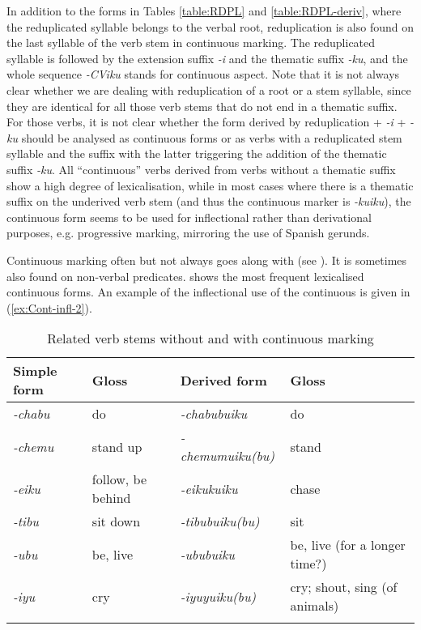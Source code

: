 In addition to the forms in Tables \ref{table:RDPL} and \ref{table:RDPL-deriv}, where the reduplicated syllable belongs to the verbal root, reduplication is also found on the last syllable of the verb stem in continuous marking. The reduplicated syllable is followed by the extension suffix \textit{-i} and the thematic suffix  \textit{-ku}, and the whole sequence \textit{-CViku} stands for continuous aspect. Note that it is not always clear whether we are dealing with reduplication of a root or a stem syllable, since they are identical for all those verb stems that do not end in a thematic suffix. For those verbs, it is not clear whether the form derived by reduplication + \textit{-i} + \textit{-ku} should be analysed as continuous forms or as verbs with a reduplicated stem syllable and the  suffix with the latter triggering the addition of the thematic suffix \textit{-ku}. All “continuous” verbs derived from verbs without a thematic suffix show a high degree of lexicalisation, while in most cases where there is a thematic suffix on the underived verb stem (and thus the continuous marker is \textit{-kuiku}), the continuous form seems to be used for inflectional rather than derivational purposes, e.g. progressive marking, mirroring the use of Spanish gerunds. 

Continuous marking often but not always goes along with  (see ). It is sometimes also found on non-verbal predicates.
 shows the most frequent lexicalised continuous forms. An example of the inflectional use of the continuous is given in (\ref{ex:Cont-infl-2}).

\begin{table}
\caption{Related verb stems without and with continuous marking}

\begin{tabularx}{\textwidth}{lllQ}
\lsptoprule
Simple form & Gloss & Derived form & Gloss \\
\midrule
\textit{-chabu} & do & \textit{-chabubuiku} & do\\
\textit{-chemu} & stand up & \textit{-chemumuiku(bu)} & stand\\
\textit{-eiku} & follow, be behind & \textit{-eikukuiku} & chase\\
\textit{-tibu} & sit down  & \textit{-tibubuiku(bu)} & sit\\
\textit{-ubu} & be, live & \textit{-ububuiku} & be, live (for a longer time?) \\
\textit{-iyu} & cry & \textit{-iyuyuiku(bu)} & cry; shout, sing (of animals)\\
\lspbottomrule
\end{tabularx}

\label{table:RDPL-cont}
\end{table}

